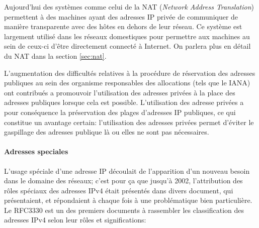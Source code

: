 Aujourd'hui des systèmes comme celui de la NAT ({\it Network Address
Translation}) permettent à des machines ayant des adresses IP privée de communiquer
de manière transparente avec des hôtes en dehors de leur réseau. Ce système est
largement utilisé dans les réseaux domestiques pour permettre aux machines au
sein de ceux-ci d'être directement connecté à Internet. On parlera plus en
détail du NAT dans la section \ref{sec:nat}.
\smallbreak

 
L'augmentation des difficultés relatives à la procédure de réservation des adresses
publiques au sein des organisme responsables des allocations\cite{url-RFC-1918}
(tels que le IANA) ont contribués a promouvoir l'utilisation des adresses privées à la place
 des adresses publiques lorsque cela est possible.
L'utilisation des adresse privées a pour conséquence la préservation des plages
d'adresses IP publiques, ce qui constitue un avantage certain: l'utilisation
des adresses privées permet d'éviter le gaspillage des adresses publique là ou elles
ne sont pas nécessaires.


\paragraph{Adresses speciales}
L'usage spéciale d'une adresse IP découlait de l'apparition d'un nouveau besoin
dans le domaine des réseaux; c'est pour ça que jusqu'à 2002, l'attribution des
rôles spéciaux des adresses IPv4 était présentés dans divers document, qui
présentaient, et répondaient à chaque fois à une problématique bien
particulière. Le RFC3330 est un des premiers documents à rassembler les
classification des adresses IPv4 selon leur rôles et significations:

